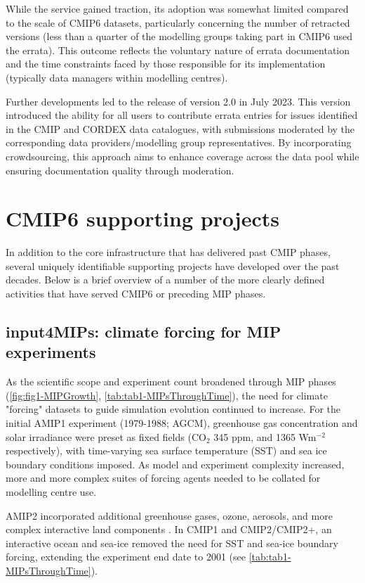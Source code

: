 \documentclass[manuscript]{copernicus}
\begin{document}
While the service gained traction, its adoption was somewhat limited compared to the scale of CMIP6 datasets, particularly concerning the number of retracted versions (less than a quarter of the modelling groups taking part in CMIP6 used the errata). This outcome reflects the voluntary nature of errata documentation and the time constraints faced by those responsible for its implementation (typically data managers within modelling centres).

Further developments led to the release of version 2.0 in July 2023. This version introduced the ability for all users to contribute errata entries for issues identified in the CMIP and CORDEX data catalogues, with submissions moderated by the corresponding data providers/modelling group representatives. By incorporating crowdsourcing, this approach aims to enhance coverage across the data pool while ensuring documentation quality through moderation.


\section{CMIP6 supporting projects}
\label{sec:CMIP6SupportingProjects}
In addition to the core infrastructure that has delivered past CMIP phases, several uniquely identifiable supporting projects have developed over the past decades. Below is a brief overview of a number of the more clearly defined activities that have served CMIP6 or preceding MIP phases.


\subsection{input4MIPs: climate forcing for MIP experiments}
\label{sec:CMIP6SupportingProjects-input4MIPs}

As the scientific scope and experiment count broadened through MIP phases (\autoref{fig:fig1-MIPGrowth}, \autoref{tab:tab1-MIPsThroughTime}), the need for climate "forcing" datasets to guide simulation evolution continued to increase. For the initial AMIP1 experiment (1979-1988; AGCM), greenhouse gas concentration and solar irradiance were preset as fixed fields (CO$_{2}$ 345 ppm, and 1365 Wm$^{-2}$ respectively), with time-varying sea surface temperature (SST) and sea ice boundary conditions imposed. As model and experiment complexity increased, more and more complex suites of forcing agents needed to be collated for modelling centre use.

AMIP2 incorporated additional greenhouse gases, ozone, aerosols, and more complex interactive land components \citep[e.g.,][]{gleckler_amip_1996-1,liang_pcmdi_1997}. In CMIP1 and CMIP2/CMIP2+, an interactive ocean and sea-ice removed the need for SST and sea-ice boundary forcing, extending the experiment end date to 2001 (see \autoref{tab:tab1-MIPsThroughTime}).
\end{document}

